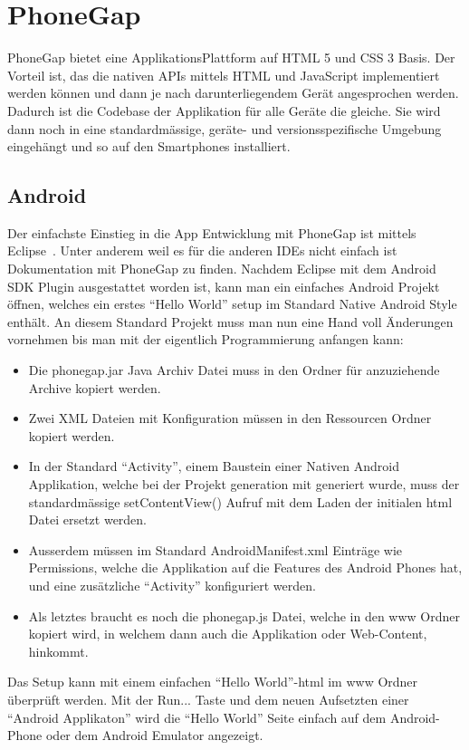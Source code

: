 
\newpage
\section{PhoneGap} %
\label{sec:PhoneGap}
PhoneGap bietet eine ApplikationsPlattform auf HTML 5 und CSS 3 Basis. Der Vorteil ist, das die nativen APIs mittels HTML und JavaScript implementiert werden können und dann je nach darunterliegendem Gerät angesprochen werden. Dadurch ist die Codebase der Applikation für alle Geräte die gleiche. Sie wird dann noch in eine standardmässige, geräte- und versionsspezifische Umgebung eingehängt und so auf den Smartphones installiert.

\subsection{Android} %
\label{sub:android}

Der einfachste Einstieg in die App Entwicklung mit PhoneGap ist mittels Eclipse~\cite{bib:eclipse}. Unter anderem weil es für die anderen IDEs nicht einfach ist Dokumentation mit PhoneGap zu finden. Nachdem Eclipse mit dem Android SDK Plugin ausgestattet worden ist, kann man ein einfaches Android Projekt öffnen, welches ein erstes "`Hello World"' setup im Standard Native Android Style enthält. 
An diesem Standard Projekt muss man nun eine Hand voll Änderungen vornehmen bis man mit der eigentlich Programmierung anfangen kann:
\begin{itemize}
    \item Die phonegap.jar Java Archiv Datei muss in den Ordner für anzuziehende Archive kopiert werden.
    \item Zwei XML Dateien mit Konfiguration müssen in den Ressourcen Ordner kopiert werden. 
    \item In der Standard "`Activity"', einem Baustein einer Nativen Android Applikation, welche bei der Projekt generation mit generiert wurde, muss der standardmässige setContentView() Aufruf mit dem Laden der initialen html Datei ersetzt werden.
    \item Ausserdem müssen im Standard AndroidManifest.xml Einträge wie Permissions, welche die Applikation auf die Features des Android Phones hat, und eine zusätzliche "`Activity"' konfiguriert werden.
    \item Als letztes braucht es noch die phonegap.js Datei, welche in den www Ordner kopiert wird, in welchem dann auch die Applikation oder Web-Content, hinkommt.
\end{itemize}
Das Setup kann mit einem einfachen "`Hello World"'-html im www Ordner überprüft werden. Mit der Run... Taste und dem neuen Aufsetzten einer "`Android Applikaton"' wird die "`Hello World"' Seite einfach auf dem Android-Phone oder dem Android Emulator angezeigt.

